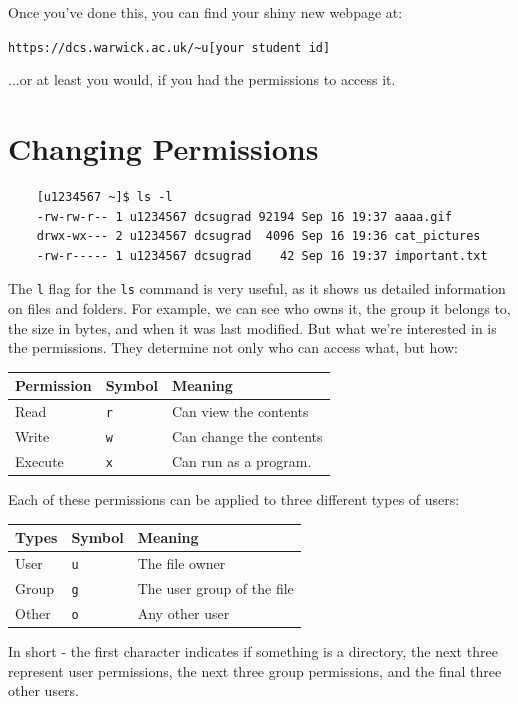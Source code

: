 \documentclass[a4paper,11pt,parskip=half-]{scrartcl}
\begin{document}
Once you've done this, you can find your shiny new webpage at:

\qquad \nolinkurl{https://dcs.warwick.ac.uk/~u[your student id]}

...or at least you would, if you had the permissions to access it.

\section*{Changing Permissions}

\begin{verbatim}
    [u1234567 ~]$ ls -l
    -rw-rw-r-- 1 u1234567 dcsugrad 92194 Sep 16 19:37 aaaa.gif
    drwx-wx--- 2 u1234567 dcsugrad  4096 Sep 16 19:36 cat_pictures
    -rw-r----- 1 u1234567 dcsugrad    42 Sep 16 19:37 important.txt
\end{verbatim}

The \texttt{l} flag for the \texttt{ls} command is very useful, as it shows us detailed information on files and folders. 
For example, we can see who owns it, the group it belongs to, the size in bytes, and when it was last modified. 
But what we're interested in is the permissions. 
They determine not only who can access what, but how:

\centering
\begin{tabular}{l|l|l}
    Permission & Symbol & Meaning \\
    \hline
    Read & \texttt{r} & Can view the contents \\
    Write & \texttt{w} & Can change the contents \\
    Execute & \texttt{x} & Can run as a program.
\end{tabular}

\raggedright

Each of these permissions can be applied to three different types of users:

\centering
\begin{tabular}{l|l|l}
    Types & Symbol & Meaning \\
    \hline
    User & \texttt{u} & The file owner \\
    Group & \texttt{g} & The user group of the file \\
    Other & \texttt{o} & Any other user
\end{tabular}

\raggedright

In short - the first character indicates if something is a directory, the next three represent user permissions, the next three group permissions, and the final three other users.
\end{document}
